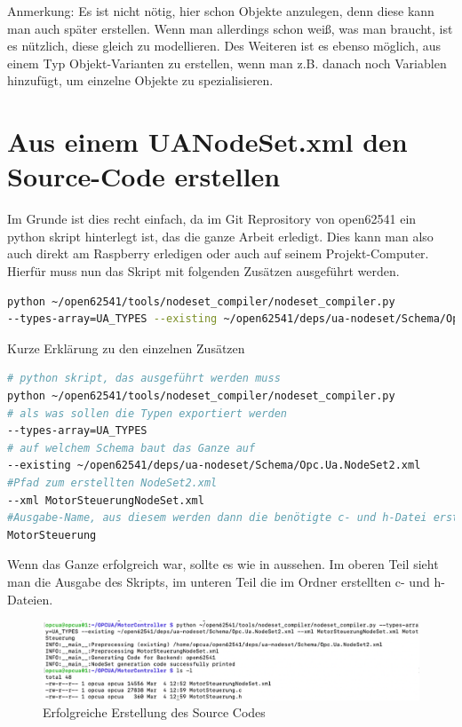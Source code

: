Anmerkung: Es ist nicht nötig, hier schon Objekte anzulegen, denn diese kann man auch später erstellen. Wenn man allerdings schon weiß, was man braucht, ist es nützlich, diese gleich zu modellieren. Des Weiteren ist es ebenso möglich, aus einem Typ Objekt-Varianten zu erstellen, wenn man z.B. danach noch Variablen hinzufügt, um einzelne Objekte zu spezialisieren.

\clearpage
\section{Aus einem UANodeSet.xml den Source-Code erstellen}
Im Grunde ist dies recht einfach, da im Git Reprository von open62541 ein python skript hinterlegt ist, das die ganze Arbeit erledigt. Dies kann man also auch direkt am Raspberry erledigen oder auch auf seinem Projekt-Computer.
Hierfür muss nun das Skript mit folgenden Zusätzen ausgeführt werden.
\begin{lstlisting}[language=Bash]
python ~/open62541/tools/nodeset_compiler/nodeset_compiler.py 
--types-array=UA_TYPES --existing ~/open62541/deps/ua-nodeset/Schema/Opc.Ua.NodeSet2.xml --xml MotorSteuerungNodeSet.xml MotorSteuerung
\end{lstlisting}
Kurze Erklärung zu den einzelnen Zusätzen
\begin{lstlisting}[language=Bash]
# python skript, das ausgeführt werden muss
python ~/open62541/tools/nodeset_compiler/nodeset_compiler.py
# als was sollen die Typen exportiert werden
--types-array=UA_TYPES
# auf welchem Schema baut das Ganze auf
--existing ~/open62541/deps/ua-nodeset/Schema/Opc.Ua.NodeSet2.xml
#Pfad zum erstellten NodeSet2.xml
--xml MotorSteuerungNodeSet.xml
#Ausgabe-Name, aus diesem werden dann die benötigte c- und h-Datei erstellt
MotorSteuerung
\end{lstlisting}
Wenn das Ganze erfolgreich war, sollte es wie in  aussehen. Im oberen Teil sieht man die Ausgabe des Skripts, im unteren Teil die im Ordner erstellten c- und h-Dateien.
\begin{figure}[H]
	\centering
	\includegraphics[width=1\linewidth]{abb/ErfolgSource}
	\caption{Erfolgreiche Erstellung des Source Codes}
	\label{fig:erfolgsource}
\end{figure}
\clearpage
